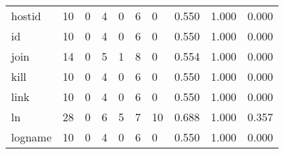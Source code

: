 \begin{longtable}{lp{2.0cm}p{2.0cm}p{2.0cm}p{2.0cm}p{2.0cm}p{2.0cm}p{2.0cm}p{2.0cm}p{2.0cm}}
hostid    &                     10 &                                             0 &                                            4 &                                           0 &                                            6 &                                          0 &                                0.550 &                                  1.000 &                                0.000 \\
id        &                     10 &                                             0 &                                            4 &                                           0 &                                            6 &                                          0 &                                0.550 &                                  1.000 &                                0.000 \\
join      &                     14 &                                             0 &                                            5 &                                           1 &                                            8 &                                          0 &                                0.554 &                                  1.000 &                                0.000 \\
kill      &                     10 &                                             0 &                                            4 &                                           0 &                                            6 &                                          0 &                                0.550 &                                  1.000 &                                0.000 \\
link      &                     10 &                                             0 &                                            4 &                                           0 &                                            6 &                                          0 &                                0.550 &                                  1.000 &                                0.000 \\
ln        &                     28 &                                             0 &                                            6 &                                           5 &                                            7 &                                         10 &                                0.688 &                                  1.000 &                                0.357 \\
logname   &                     10 &                                             0 &                                            4 &                                           0 &                                            6 &                                          0 &                                0.550 &                                  1.000 &                                0.000 \\

\end{longtable}
